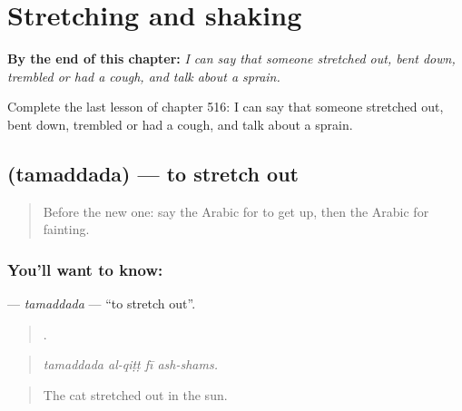 
\chapter{Stretching and shaking}
\label{ch:ar-stretching-and-shaking}

\begin{chapteropening}
\textbf{By the end of this chapter:} \emph{I can say that someone stretched out, bent down, trembled or had a cough, and talk about a sprain.}

Complete the last lesson of chapter 516: I can say that someone stretched out, bent down, trembled or had a cough, and talk about a sprain.
\end{chapteropening}

\section[\texorpdfstring{\ar{تمدد} (tamaddada)}{تمدد (tamaddada)}]{ (tamaddada) — to stretch out}

\label{lesson:AR-C516-tamaddada}



\begin{quote}
Before the new one: say the Arabic for to get up, then the Arabic for fainting.
\end{quote}

\subsection*{You'll want to know: }
\textbf{} — \emph{tamaddada} — \textquotedblleft{}to stretch out\textquotedblright{}.

\begin{quote}
   .
\end{quote}

\begin{quote}
\emph{tamaddada al-qiṭṭ fī ash-shams.}
\end{quote}

\begin{quote}
The cat stretched out in the sun.
\end{quote}

